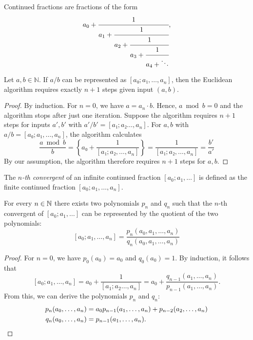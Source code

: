 Continued fractions are fractions of the form
\[
  a_0 + \cfrac{1}{a_1 + \cfrac{1}{a_2 + \cfrac{1}{a_3 + \cfrac{1}{a_4 + \ddots}}}},
\]

\begin{proposition}
  Let $a, b ∈ ℕ$.
  If $a/b$ can be represented as $[a₀; a₁, \dots, a_n]$, then the Euclidean
  algorithm requires exactly $n + 1$ steps given input $(a, b)$.
\end{proposition}

\begin{proof}
  By induction.
  For $n = 0$, we have $a = a_n · b$.
  Hence, $a \bmod b = 0$ and the algorithm stops after just one iteration.
  Suppose the algorithm requires $n + 1$ steps for inputs $a', b'$ with $a'/b' = [a₁; a₂ \dots, a_n]$.
  For $a, b$ with $a/b = [a₀; a₁, \dots, a_n]$, the algorithm calculates
  \[
    \frac{a \bmod b}{b} = \left\{a₀ + \frac{1}{[a₁; a₂, \dots, a_n]} \right\} = \frac{1}{[a₁; a₂, \dots, a_n]} = \frac{b'}{a'}
  \]
  By our assumption, the algorithm therefore requires $n + 1$ steps for $a, b$.
\end{proof}

\begin{definition}
  The \emph{$n$-th convergent} of an infinite continued fraction $[a_0; a_1, \dots]$
  is defined as the finite continued fraction $[a_0; a_1, \dots, a_n]$.
\end{definition}

\begin{lemma}
  For every $n \in {\mathbb N}$ there exists two polynomials $p_n$ and $q_n$ such that the
  $n$-th convergent of $[a_0; a_1, \dots]$ can be represented by the quotient
  of the two polynomials:
  \[
    [a_0; a_1, \dots, a_n] = \frac{p_n(a_0, a_1, \dots, a_n)}{q_n(a_0, a_1, \dots, a_n)}
  \]
\end{lemma}

\begin{proof}
  For $n = 0$, we have $p_0(a_0) = a_0$ and $q_0(a_0) = 1$.
  By induction, it follows that
  \[
    [a_0; a_1, \dots, a_n] = a_0 + \frac{1}{[a_1; a_2 \dots, a_n]} = a_0 + \frac{q_{n-1}(a_1, \dots, a_n)}{p_{n-1}(a_1, \dots, a_n)}.
  \]
  From this, we can derive the polynomials $p_n$ and $q_n$:
  \begin{align*}
    p_n(a_0, \dots, a_n) & = a_0 p_{n-1}(a_1, \dots, a_n) + p_{n-2}(a_2, \dots, a_n) \\
    q_n(a_0, \dots, a_n) & = p_{n-1}(a_1, \dots, a_n). \qedhere
  \end{align*}
\end{proof}

